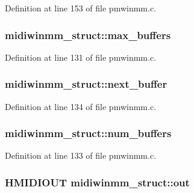 Definition at line 153 of file pmwinmm.\+c.

\subsubsection[{\texorpdfstring{max\+\_\+buffers}{max_buffers}}]{ midiwinmm\+\_\+struct\+::max\+\_\+buffers}\hypertarget{structmidiwinmm__struct_a75935764565996299a4b6c3f6b93e9fd}{}\label{structmidiwinmm__struct_a75935764565996299a4b6c3f6b93e9fd}


Definition at line 131 of file pmwinmm.\+c.

\subsubsection[{\texorpdfstring{next\+\_\+buffer}{next_buffer}}]{ midiwinmm\+\_\+struct\+::next\+\_\+buffer}\hypertarget{structmidiwinmm__struct_a88bc98c540b46439ee781d902e6c20a2}{}\label{structmidiwinmm__struct_a88bc98c540b46439ee781d902e6c20a2}


Definition at line 134 of file pmwinmm.\+c.

\subsubsection[{\texorpdfstring{num\+\_\+buffers}{num_buffers}}]{ midiwinmm\+\_\+struct\+::num\+\_\+buffers}\hypertarget{structmidiwinmm__struct_ada80cf474e7330d17abfd1aefbdb7bf3}{}\label{structmidiwinmm__struct_ada80cf474e7330d17abfd1aefbdb7bf3}


Definition at line 133 of file pmwinmm.\+c.

\subsubsection[{\texorpdfstring{out}{out}}]{\setlength{\rightskip}{0pt plus 5cm}H\+M\+I\+D\+I\+O\+UT midiwinmm\+\_\+struct\+::out}\hypertarget{structmidiwinmm__struct_af3f572e57c53d6b97775e0f26cd9d0d5}{}\label{structmidiwinmm__struct_af3f572e57c53d6b97775e0f26cd9d0d5}


